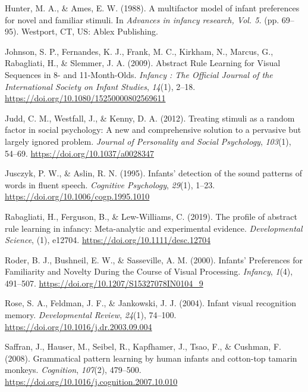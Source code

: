 \documentclass[english,man,man,floatsintext]{apa6}
\begin{document}
\leavevmode\hypertarget{ref-hunter1988}{}%
Hunter, M. A., \& Ames, E. W. (1988). A multifactor model of infant preferences for novel and familiar stimuli. In \emph{Advances in infancy research, Vol. 5.} (pp. 69--95). Westport, CT, US: Ablex Publishing.

\leavevmode\hypertarget{ref-johnson2009}{}%
Johnson, S. P., Fernandes, K. J., Frank, M. C., Kirkham, N., Marcus, G., Rabagliati, H., \& Slemmer, J. A. (2009). Abstract Rule Learning for Visual Sequences in 8- and 11-Month-Olds. \emph{Infancy : The Official Journal of the International Society on Infant Studies}, \emph{14}(1), 2--18. \url{https://doi.org/10.1080/15250000802569611}

\leavevmode\hypertarget{ref-judd2012}{}%
Judd, C. M., Westfall, J., \& Kenny, D. A. (2012). Treating stimuli as a random factor in social psychology: A new and comprehensive solution to a pervasive but largely ignored problem. \emph{Journal of Personality and Social Psychology}, \emph{103}(1), 54--69. \url{https://doi.org/10.1037/a0028347}

\leavevmode\hypertarget{ref-jusczyk1995}{}%
Jusczyk, P. W., \& Aslin, R. N. (1995). Infants' detection of the sound patterns of words in fluent speech. \emph{Cognitive Psychology}, \emph{29}(1), 1--23. \url{https://doi.org/10.1006/cogp.1995.1010}

\leavevmode\hypertarget{ref-rabagliati2019}{}%
Rabagliati, H., Ferguson, B., \& Lew-Williams, C. (2019). The profile of abstract rule learning in infancy: Meta-analytic and experimental evidence. \emph{Developmental Science}, (1), e12704. \url{https://doi.org/10.1111/desc.12704}

\leavevmode\hypertarget{ref-roder2000}{}%
Roder, B. J., Bushneil, E. W., \& Sasseville, A. M. (2000). Infants' Preferences for Familiarity and Novelty During the Course of Visual Processing. \emph{Infancy}, \emph{1}(4), 491--507. \url{https://doi.org/10.1207/S15327078IN0104_9}

\leavevmode\hypertarget{ref-rose2004}{}%
Rose, S. A., Feldman, J. F., \& Jankowski, J. J. (2004). Infant visual recognition memory. \emph{Developmental Review}, \emph{24}(1), 74--100. \url{https://doi.org/10.1016/j.dr.2003.09.004}

\leavevmode\hypertarget{ref-saffran2008}{}%
Saffran, J., Hauser, M., Seibel, R., Kapfhamer, J., Tsao, F., \& Cushman, F. (2008). Grammatical pattern learning by human infants and cotton-top tamarin monkeys. \emph{Cognition}, \emph{107}(2), 479--500. \url{https://doi.org/10.1016/j.cognition.2007.10.010}
\end{document}
